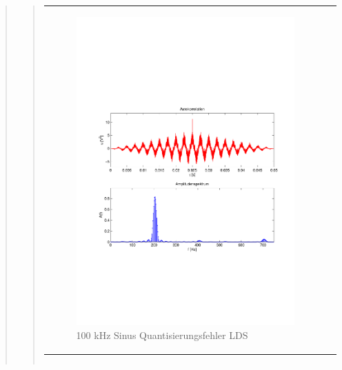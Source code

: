 \begin{quote}
\begin{quote}
\begin{center}
\begin{tabular}{ll}
                \begin{minipage}{0.6\textwidth}
                    \begin{figure}[H]
                        \includegraphics[scale=0.5, trim = 16mm 70mm 16mm 85mm, clip]
                                        {Bilder/100kHz_sin_LSD}
                        \caption{100 kHz Sinus Quantisierungsfehler LDS}
                        \label{fig:100kHz_sin_LDS}
                    \end{figure}
                \end{minipage}
            
            \end{tabular}
        \end{center}
        
        
        
        \begin{center}
            \begin{tabular}{ll}
            

\end{tabular}
\end{center}
\end{quote}
\end{quote}
